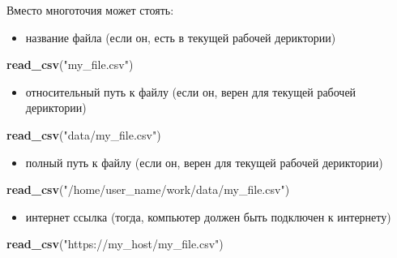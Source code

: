 \documentclass[]{book}
\newenvironment{Shaded}{\begin{snugshade}}{\end{snugshade}}
\newcommand{\KeywordTok}[1]{\textcolor[rgb]{0.13,0.29,0.53}{\textbf{#1}}}
\newcommand{\NormalTok}[1]{#1}
\newcommand{\StringTok}[1]{\textcolor[rgb]{0.31,0.60,0.02}{#1}}
\providecommand{\tightlist}{%
  \setlength{\itemsep}{0pt}\setlength{\parskip}{0pt}}
\begin{document}
Вместо многоточия может стоять:

\begin{itemize}
\tightlist
\item
  название файла (если он, есть в текущей рабочей дериктории)
\end{itemize}

\begin{Shaded}
\begin{Highlighting}[]
\KeywordTok{read_csv}\NormalTok{(}\StringTok{"my_file.csv"}\NormalTok{)}
\end{Highlighting}
\end{Shaded}

\begin{itemize}
\tightlist
\item
  относительный путь к файлу (если он, верен для текущей рабочей дериктории)
\end{itemize}

\begin{Shaded}
\begin{Highlighting}[]
\KeywordTok{read_csv}\NormalTok{(}\StringTok{"data/my_file.csv"}\NormalTok{)}
\end{Highlighting}
\end{Shaded}

\begin{itemize}
\tightlist
\item
  полный путь к файлу (если он, верен для текущей рабочей дериктории)
\end{itemize}

\begin{Shaded}
\begin{Highlighting}[]
\KeywordTok{read_csv}\NormalTok{(}\StringTok{"/home/user_name/work/data/my_file.csv"}\NormalTok{)}
\end{Highlighting}
\end{Shaded}

\begin{itemize}
\tightlist
\item
  интернет ссылка (тогда, компьютер должен быть подключен к интернету)
\end{itemize}

\begin{Shaded}
\begin{Highlighting}[]
\KeywordTok{read_csv}\NormalTok{(}\StringTok{"https://my_host/my_file.csv"}\NormalTok{)}
\end{Highlighting}
\end{Shaded}
\end{document}
